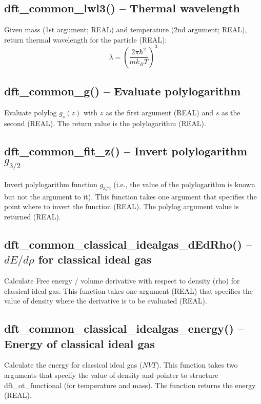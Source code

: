 \documentclass[12pt,letterpaper]{report}
\begin{document}
\subsection{dft\_common\_lwl3() -- Thermal wavelength}

Given mass (1st argument; REAL) and temperature (2nd argument; REAL), return thermal wavelength for the particle (REAL):
$$\lambda = \left(\frac{2\pi\hbar^2}{m k_B T}\right)^3$$

\subsection{dft\_common\_g() -- Evaluate polylogarithm}

Evaluate polylog $g_s(z)$ with $z$ as the first argument (REAL) and $s$ as the second (REAL). The return value is the polylogarithm (REAL).

\subsection{dft\_common\_fit\_z() -- Invert polylogarithm $g_{3/2}$}

Invert polylogarithm function $g_{3/2}$ (i.e., the value of the polylogarithm is known but not the argument to it). This function takes one argument that specifies the point where to invert the function (REAL). The polylog argument value is returned (REAL).

\subsection{dft\_common\_classical\_idealgas\_dEdRho() -- $dE/d\rho$ for classical ideal gas}

Calculate Free energy / volume derivative with respect to density (rho) for classical ideal gas. This function takes one argument (REAL) that specifies the value of density where the derivative is to be evaluated (REAL).

\subsection{dft\_common\_classical\_idealgas\_energy() -- Energy of classical ideal gas}

Calculate the energy for classical ideal gas ($NVT$). This function takes two arguments that specify the value of density and pointer to structure dft\_ot\_functional (for temperature and mass). The function returns the energy (REAL).
\end{document}
